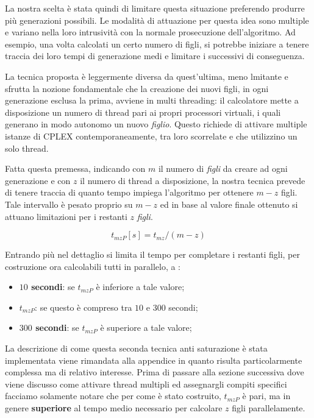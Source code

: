 \documentclass[11pt]{article}
\begin{document}
La nostra scelta è stata quindi di limitare questa situazione preferendo produrre più generazioni possibili. Le modalità di attuazione per questa idea sono multiple e variano nella loro intrusività con la normale prosecuzione dell'algoritmo. Ad esempio, una volta calcolati un certo numero di figli, si potrebbe iniziare a tenere traccia dei loro tempi di generazione medi e limitare i successivi di conseguenza.

La tecnica proposta è leggermente diversa da quest'ultima, meno lmitante e sfrutta la nozione fondamentale che la creazione dei nuovi figli, in ogni generazione esclusa la prima, avviene in multi threading: il calcolatore mette a disposizione un numero di thread pari ai propri processori virtuali, i quali generano in modo autonomo un nuovo \textit{figlio}. Questo richiede di attivare multiple istanze di CPLEX contemporaneamente, tra loro scorrelate e che utilizzino un solo thread.

Fatta questa premessa, indicando con $m$ il numero di \textit{figli} da creare ad ogni generazione e con $z$ il numero di thread a disposizione, la nostra tecnica prevede di tenere traccia di quanto tempo impiega l'algoritmo per ottenere $m-z$ figli. Tale intervallo è pesato proprio su $m-z$ ed in base al valore finale ottenuto si attuano limitazioni per i restanti $z$ \textit{figli}.

\begin{equation}\label{eq:tMZ}
\displaystyle t_{mzP}[s] = t_{mz}/(m-z)
\end{equation}

Entrando più nel dettaglio si limita il tempo per completare i restanti figli, per costruzione ora calcolabili tutti in parallelo, a :

\begin{itemize}
    \item \textbf{$10$ secondi}: se $t_{mzP}$ è inferiore a tale valore;
    \item \textbf{$t_{mzP}$}: se questo è compreso tra $10$ e $300$ secondi;
    \item \textbf{$300$ secondi}: se  $t_{mzP}$ è superiore a tale valore;
\end{itemize}

La descrizione di come questa seconda tecnica anti saturazione è stata implementata viene rimandata alla appendice in quanto risulta particolarmente complessa ma di relativo interesse. Prima di passare alla sezione successiva dove viene discusso come attivare thread multipli ed assegnargli compiti specifici facciamo solamente notare che per come è stato costruito, $t_{mzP}$ è pari, ma in genere \textbf{superiore} al tempo medio necessario per calcolare $z$ figli parallelamente.
\end{document}
